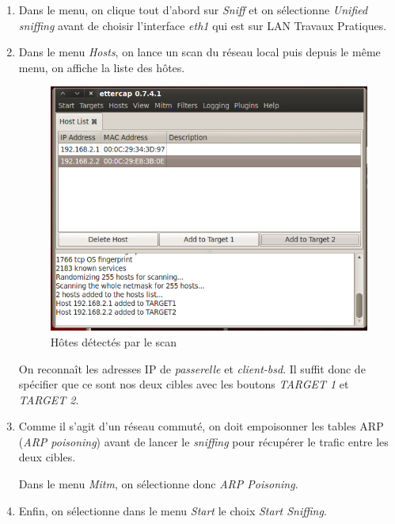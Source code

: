 \documentclass[a4paper]{article}
\begin{document}
\begin{enumerate}

\item Dans le menu, on clique tout d'abord sur \textit{Sniff} et on sélectionne 
\textit{Unified sniffing} avant de choisir l'interface \textit{eth1}
qui est sur LAN Travaux Pratiques.

\item Dans le menu \textit{Hosts}, on lance un scan du réseau local puis
depuis le même menu, on affiche la liste des hôtes.

\begin{figure}[!ht]
	\centering
	\includegraphics[scale=.4]{Hosts.PNG}
	\caption{\label{hosts} Hôtes détectés par le scan}
\end{figure}

On reconnaît les adresses IP de \textit{passerelle} et 
\textit{client-bsd}. Il suffit donc de spécifier que ce sont
nos deux cibles avec les boutons \textit{TARGET 1} et \textit{TARGET 2}.

\item Comme il s'agit d'un réseau commuté, on doit empoisonner les tables
ARP (\textit{ARP poisoning}) avant de lancer le \textit{sniffing} pour
récupérer le trafic entre les deux cibles.

Dans le menu \textit{Mitm}, on sélectionne donc \textit{ARP Poisoning}.

\item Enfin, on sélectionne dans le menu \textit{Start} le choix \textit{Start Sniffing}.

\end{enumerate}
\end{document}
